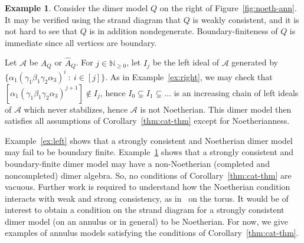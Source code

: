 \documentclass{article}
\theoremstyle{definition}
\newtheorem{example}[thm]{Example}
\begin{document}
\begin{example}\label{ex:rightest}
	Consider the dimer model $Q$ on the right of Figure~\ref{fig:noeth-ann}. It may be verified using the strand diagram that $Q$ is weakly consistent, and it is not hard to see that $Q$ is in addition nondegenerate. Boundary-finiteness of $Q$ is immediate since all vertices are boundary.

	Let $\mathcal A$ be $A_Q$ or $\widehat A_Q$.
	For $j\in\mathbb N_{\geq0}$, let $I_j$ be the left ideal of $\mathcal A$ generated by $\{\alpha_1(\gamma_1\beta_1\gamma_2\alpha_3)^i\ :\ i\in[j]\}$. As in Example~\ref{ex:right}, we may check that $[\alpha_1(\gamma_1\beta_1\gamma_2\alpha_3)^{j+1}]\not\in I_j$, hence $I_0\subsetneq I_1\subsetneq\dots$ is an increasing chain of left ideals of $\mathcal A$ which never stabilizes, hence $\mathcal A$ is not Noetherian.
	This dimer model then satisfies all assumptions of Corollary~\ref{thm:cat-thm} except for Noetherianness.
\end{example}

Example~\ref{ex:left} shows that a strongly consistent and Noetherian dimer model may fail to be boundary finite. Example~\ref{ex:rightest} shows that a strongly consistent and boundary-finite dimer model may have a non-Noetherian (completed and noncompleted) dimer algebra. So, no conditions of Corollary~\ref{thm:cat-thm} are vacuous.
Further work is required to understand how the Noetherian condition interacts with weak and strong consistency, as in~\cite{Beil2021} on the torus. It would be of interest to obtain a condition on the strand diagram for a strongly consistent dimer model (on an annulus or in general) to be Noetherian.
For now, we give examples of annulus models satisfying the conditions of Corollary~\ref{thm:cat-thm}.
\end{document}
